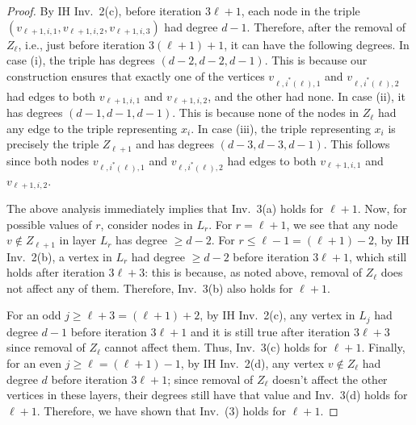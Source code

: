 \begin{proof}
 By IH Inv.~2(c), before iteration $3\ell+1$, each node in the triple $(v_{\ell+1,i,1}, v_{\ell+1,i,2}, v_{\ell+1,i,3})$ had degree $d-1$. Therefore, after the removal of $Z_\ell$, i.e., just before iteration $3(\ell+1)+1$, it can have the following degrees. In case (i), the triple has degrees $(d-2, d-2, d-1)$. This is because our construction ensures that exactly one of the vertices $v_{\ell,i^*(\ell),1}$ and $v_{\ell,i^*(\ell),2}$ had edges to both $v_{\ell+1,i,1}$ and $v_{\ell+1,i,2}$, and the other had none. In case (ii), it has degrees $(d-1,d-1,d-1)$. This is because none of the nodes in $Z_{\ell}$ had any edge to the triple representing $x_i$. In case (iii), the triple representing $x_i$ is precisely the triple $Z_{\ell+1}$ and has degrees $(d-3,d-3,d-1)$. This follows since both nodes $v_{\ell,i^*(\ell),1}$ and $v_{\ell,i^*(\ell),2}$ had edges to both $v_{\ell+1,i,1}$ and $v_{\ell+1,i,2}$. 
 
 The above analysis immediately implies that Inv.~3(a) holds for $\ell+1$. Now, for possible values of $r$, consider nodes in $L_r$. For $r=\ell+1$, we see that any node $v\not\in Z_{\ell+1}$ in layer $L_r$ has degree $\geq d-2$. For $r\leq \ell-1=(\ell+1)-2$, by IH Inv.~2(b), a vertex in $L_r$ had degree $\geq d-2$ before iteration $3\ell+1$, which still holds after iteration $3\ell+3$: this is because, as noted above, removal of $Z_{\ell}$ does not affect any of them. Therefore, Inv.~3(b) also holds for $\ell+1$. 
 
 For an odd $j\geq \ell+3=(\ell+1)+2$, by IH Inv.~2(c), any vertex in $L_j$ had degree $d-1$ before iteration $3\ell+1$ and it is still true after iteration $3\ell+3$ since removal of $Z_{\ell}$ cannot affect them. Thus, Inv.~3(c) holds for $\ell+1$. Finally, for an even $j\geq \ell=(\ell+1)-1$, by IH Inv.~2(d), any vertex $v\not\in Z_\ell$ had degree $d$ before iteration $3\ell+1$; since removal of $Z_{\ell}$ doesn't affect the other vertices in these layers, their degrees still have that value and Inv.~3(d) holds for $\ell+1$. Therefore, we have shown that Inv.~(3) holds for $\ell+1$.


\end{proof}
